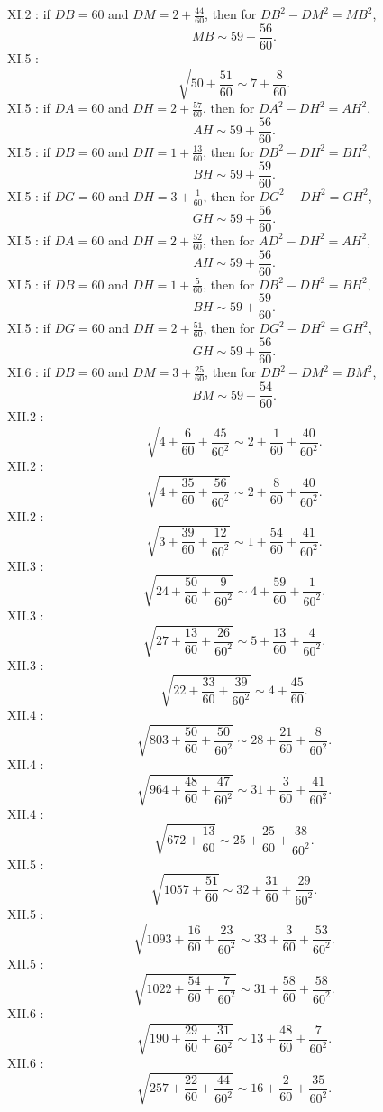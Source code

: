 \documentclass{amsart}
\theoremstyle{definition}
\begin{document}
XI.2 \cite[p.~521]{almagest}: if $DB=60$ and $DM=2+\frac{44}{60}$, then for
$DB^2-DM^2=MB^2$,
\[
MB \sim 59+\frac{56}{60}.
\]
XI.5 \cite[p.~528]{almagest}: 
\[
\sqrt{50+\frac{51}{60}} \sim 7+\frac{8}{60}.
\]
XI.5 \cite[p.~529]{almagest}: if $DA=60$ and $DH=2+\frac{57}{60}$, then for $DA^2-DH^2=AH^2$,
\[
AH \sim 59+\frac{56}{60}.
\]
XI.5 \cite[p.~531]{almagest}: if $DB=60$ and $DH=1+\frac{13}{60}$, then for $DB^2-DH^2=BH^2$,
\[
BH \sim 59+\frac{59}{60}.
\]
XI.5 \cite[p.~533]{almagest}: if $DG=60$ and $DH=3+\frac{1}{60}$, then for $DG^2-DH^2=GH^2$,
\[
GH \sim 59+\frac{56}{60}.
\]
XI.5 \cite[p.~534]{almagest}: if $DA=60$ and $DH=2+\frac{52}{60}$, then for $AD^2-DH^2=AH^2$,
\[
AH \sim 59+\frac{56}{60}.
\]
XI.5 \cite[pp.~535--536]{almagest}: if $DB=60$ and $DH=1+\frac{5}{60}$, then for $DB^2-DH^2=BH^2$,
\[
BH \sim 59+\frac{59}{60}.
\]
XI.5 \cite[p.~537]{almagest}: if $DG=60$ and $DH=2+\frac{51}{60}$, then for $DG^2-DH^2=GH^2$,
\[
GH \sim 59+\frac{56}{60}.
\]
XI.6 \cite[p.~540]{almagest}: if $DB=60$ and $DM=3+\frac{25}{60}$, then for $DB^2-DM^2=BM^2$,
\[
BM \sim 59+\frac{54}{60}.
\]
XII.2 \cite[p.~564]{almagest}: 
\[
\sqrt{4+\frac{6}{60}+\frac{45}{60^2}} \sim 2+\frac{1}{60}+\frac{40}{60^2}.
\]
XII.2 \cite[p.~566]{almagest}:
\[
\sqrt{4+\frac{35}{60}+\frac{56}{60^2}} \sim 2+\frac{8}{60}+\frac{40}{60^2}.
\]
XII.2 \cite[p.~568]{almagest}:
\[
\sqrt{3+\frac{39}{60}+\frac{12}{60^2}} \sim 1+\frac{54}{60}+\frac{41}{60^2}.
\]
XII.3 \cite[p.~570]{almagest}:
\[
\sqrt{24+\frac{50}{60}+\frac{9}{60^2}} \sim 4+\frac{59}{60}+\frac{1}{60^2}.
\]
XII.3 \cite[p.~571]{almagest}:
\[
\sqrt{27+\frac{13}{60}+\frac{26}{60^2}} \sim 5+\frac{13}{60}+\frac{4}{60^2}.
\]
XII.3 \cite[p.~571]{almagest}:
\[
\sqrt{22+\frac{33}{60}+\frac{39}{60^2}} \sim 4+\frac{45}{60}.
\]
XII.4 \cite[p.~572]{almagest}:
\[
\sqrt{803+\frac{50}{60}+\frac{50}{60^2}} \sim 28+\frac{21}{60}+\frac{8}{60^2}.
\]
XII.4 \cite[p.~574]{almagest}:
\[
\sqrt{964+\frac{48}{60}+\frac{47}{60^2}} \sim 31+\frac{3}{60}+\frac{41}{60^2}.
\]
XII.4 \cite[pp.~574--575]{almagest}:
\[
\sqrt{672+\frac{13}{60}} \sim 25+\frac{25}{60}+\frac{38}{60^2}.
\]
XII.5 \cite[pp.~575--576]{almagest}:
\[
\sqrt{1057+\frac{51}{60}} \sim 32+\frac{31}{60}+\frac{29}{60^2}.
\]
XII.5 \cite[p.~577]{almagest}:
\[
\sqrt{1093+\frac{16}{60}+\frac{23}{60^2}} \sim 33+\frac{3}{60}+\frac{53}{60^2}.
\]
XII.5 \cite[p.~578]{almagest}:
\[
\sqrt{1022+\frac{54}{60}+\frac{7}{60^2}} \sim 31+\frac{58}{60}+\frac{58}{60^2}.
\]
XII.6 \cite[p.~579]{almagest}:
\[
\sqrt{190+\frac{29}{60}+\frac{31}{60^2}} \sim 13+\frac{48}{60}+\frac{7}{60^2}.
\]
XII.6 \cite[p.~580]{almagest}:
\[
\sqrt{257+\frac{22}{60}+\frac{44}{60^2}} \sim 16+\frac{2}{60}+\frac{35}{60^2}.
\]
\end{document}
